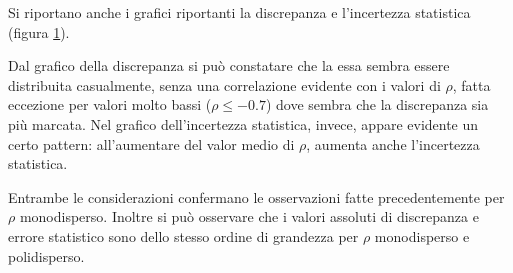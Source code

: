 \documentclass[a4paper,12pt,twoside,openright]{report}
\begin{document}
Si riportano anche i grafici riportanti la discrepanza e l'incertezza statistica (figura \ref{fig:errorsamen5rhopoli}).
\begin{figure}[!ht]
	\centering
	\caption{}
	\label{fig:errorsamen5rhopoli}
\end{figure}
Dal grafico della discrepanza si può constatare che la essa sembra essere distribuita casualmente, senza una correlazione evidente con i valori di $\rho$, fatta eccezione per valori molto bassi ($ \rho \le -0.7 $) dove sembra che la discrepanza sia più marcata.
Nel grafico dell'incertezza statistica, invece, appare evidente un certo pattern: all'aumentare del valor medio di $\rho$, aumenta anche l'incertezza statistica.

Entrambe le considerazioni confermano le osservazioni fatte precedentemente per $\rho$ monodisperso. Inoltre si può osservare che i valori assoluti di discrepanza e errore statistico sono dello stesso ordine di grandezza per $\rho$ monodisperso e polidisperso.
\end{document}
